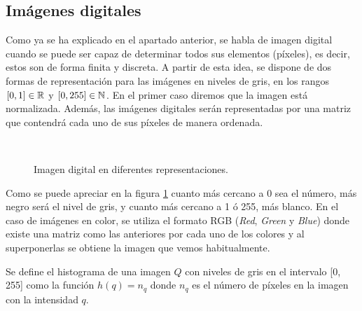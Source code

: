\documentclass[main]{subfiles}
\begin{document}
\subsection{Imágenes digitales}\label{sec:imagenesdigitales}
Como ya se ha explicado en el apartado anterior, se habla de imagen digital cuando se puede ser capaz de determinar todos sus elementos (píxeles), es decir, estos son de forma finita y discreta. A partir de esta idea, se dispone de dos formas de representación para las imágenes en niveles de gris, en los rangos $[0,1]\in\mathbb{R}$ y $[0,255]\in\mathbb{N}$. En el primer caso diremos que la imagen está normalizada. Además, las imágenes digitales serán representadas por una matriz que contendrá cada uno de sus píxeles de manera ordenada.


\begin{figure}
\centering
    \quad
    \quad\
    \caption{Imagen digital en diferentes representaciones.}
    \label{fig:defimagen}
\end{figure}

Como se puede apreciar en la figura \ref{fig:defimagen} cuanto más cercano a 0 sea el número, más negro será el nivel de gris, y cuanto más cercano a 1 ó 255, más blanco. En el caso de imágenes en color, se utiliza el formato RGB ({\em Red}, {\em Green} y {\em Blue}) donde existe una matriz como las anteriores por cada uno de los colores y al superponerlas se obtiene la imagen que vemos habitualmente.

\begin{definition}\label{def:histograma}
Se define el histograma de una imagen $Q$ con niveles de gris en el intervalo [0, 255] como la función $h(q) = n_q$ donde $n_q$ es el número de píxeles en la imagen con la intensidad $q$.
\end{definition}
\end{document}
